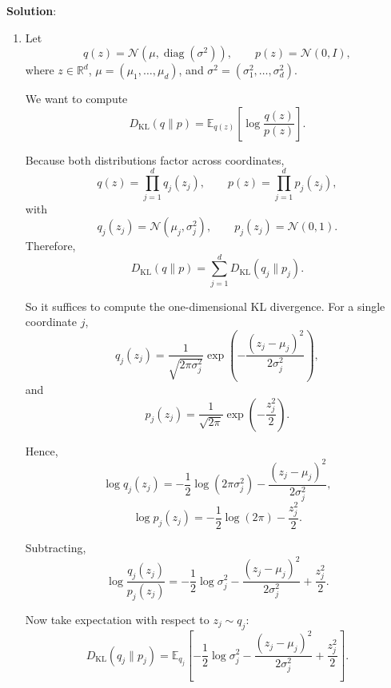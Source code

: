 \documentclass[submit]{harvardml}
\newenvironment{solution}{
    \vspace{2mm}
    \color{blue}\noindent\textbf{Solution}:
}{}
\begin{document}
\begin{solution}
\begin{enumerate}
\begin{enumerate}
Since \(\epsilon \sim \mathcal{N}(0,I)\), each coordinate \(\epsilon_i\) is independent with
\[
\epsilon_i \sim \mathcal{N}(0,1).
\]
Therefore, for each coordinate \(i\),
\[
z_i = \mu_{\phi,i}(x) + \sigma_{\phi,i}(x)\epsilon_i.
\]
A Gaussian is again Gaussian so
\[
z_i \sim \mathcal{N}\!\left(\mu_{\phi,i}(x), \sigma_{\phi,i}^2(x)\right).
\]
Because the coordinates of \(\epsilon\) are independent, the coordinates of \(z\) are also independent, hence
\[
z \sim \mathcal{N}\!\left(\mu_\phi(x), \operatorname{diag}(\sigma_\phi^2(x))\right)
=
q_\phi(z\mid x).
\]

This makes the loss differentiable with respect to \(\phi\) because the randomness is isolated in \(\epsilon\), which is independent of the parameters, while \(z\) is now written as a differentiable function of \(\mu_\phi(x)\) and \(\sigma_\phi(x)\). Therefore gradients can pass through
\[
z = \mu_\phi(x) + \sigma_\phi(x)\odot \epsilon
\]
using  backpropagation.
        \item Let
\[
q(z)=\mathcal{N}\!\left(\mu,\operatorname{diag}(\sigma^2)\right),
\qquad
p(z)=\mathcal{N}(0,I),
\]
where \(z\in\mathbb{R}^d\), \(\mu=(\mu_1,\dots,\mu_d)\), and \(\sigma^2=(\sigma_1^2,\dots,\sigma_d^2)\).

We want to compute
\[
D_{\mathrm{KL}}(q\|p)
=
\mathbb{E}_{q(z)}\left[\log \frac{q(z)}{p(z)}\right].
\]

Because both distributions factor across coordinates,
\[
q(z)=\prod_{j=1}^d q_j(z_j),
\qquad
p(z)=\prod_{j=1}^d p_j(z_j),
\]
with
\[
q_j(z_j)=\mathcal{N}(\mu_j,\sigma_j^2),
\qquad
p_j(z_j)=\mathcal{N}(0,1).
\]
Therefore,
\[
D_{\mathrm{KL}}(q\|p)
=
\sum_{j=1}^d D_{\mathrm{KL}}(q_j\|p_j).
\]

So it suffices to compute the one-dimensional KL divergence. For a single coordinate \(j\),
\[
q_j(z_j)=\frac{1}{\sqrt{2\pi\sigma_j^2}}
\exp\!\left(-\frac{(z_j-\mu_j)^2}{2\sigma_j^2}\right),
\]
and
\[
p_j(z_j)=\frac{1}{\sqrt{2\pi}}
\exp\!\left(-\frac{z_j^2}{2}\right).
\]

Hence,
\[
\log q_j(z_j)
=
-\frac{1}{2}\log(2\pi\sigma_j^2)
-\frac{(z_j-\mu_j)^2}{2\sigma_j^2},
\]
\[
\log p_j(z_j)
=
-\frac{1}{2}\log(2\pi)
-\frac{z_j^2}{2}.
\]

Subtracting,
\[
\log \frac{q_j(z_j)}{p_j(z_j)}
=
-\frac{1}{2}\log \sigma_j^2
-\frac{(z_j-\mu_j)^2}{2\sigma_j^2}
+\frac{z_j^2}{2}.
\]

Now take expectation with respect to \(z_j\sim q_j\):
\[
D_{\mathrm{KL}}(q_j\|p_j)
=
\mathbb{E}_{q_j}\left[
-\frac{1}{2}\log \sigma_j^2
-\frac{(z_j-\mu_j)^2}{2\sigma_j^2}
+\frac{z_j^2}{2}
\right].
\]


\end{enumerate}
\end{enumerate}
\end{solution}
\end{document}
